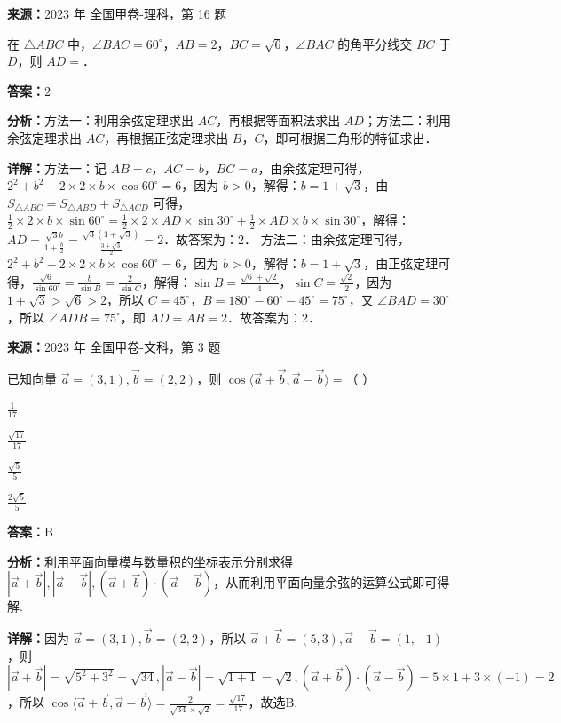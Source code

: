 \begin{question}[points=5]
\textbf{来源：}2023 年 全国甲卷-理科，第 16 题\par
在 $\triangle ABC$ 中，$\angle BAC = 60^\circ$，$AB = 2$，$BC = \sqrt{6}$，$\angle BAC$ 的角平分线交 $BC$ 于 $D$，则 $AD = $．
\fillin[{$2$}]
\begin{solution}
\textbf{答案：}$2$

\textbf{分析：}方法一：利用余弦定理求出 $AC$，再根据等面积法求出 $AD$；方法二：利用余弦定理求出 $AC$，再根据正弦定理求出 $B$，$C$，即可根据三角形的特征求出．

\textbf{详解：}方法一：记 $AB=c$，$AC=b$，$BC=a$，由余弦定理可得，$2^2+b^2-2\times2\times b\times\cos60^\circ = 6$，因为 $b>0$，解得：$b=1+\sqrt{3}$，由 $S_{\triangle ABC} = S_{\triangle ABD} + S_{\triangle ACD}$ 可得，$\frac{1}{2}\times2\times b\times\sin60^\circ = \frac{1}{2}\times2\times AD\times\sin30^\circ + \frac{1}{2}\times AD\times b\times\sin30^\circ$，解得：$AD = \frac{\sqrt{3}b}{1+\frac{b}{2}} = \frac{\sqrt{3}(1+\sqrt{3})}{\frac{3+\sqrt{3}}{2}} = 2$．故答案为：2．
方法二：由余弦定理可得，$2^2+b^2-2\times2\times b\times\cos60^\circ = 6$，因为 $b>0$，解得：$b=1+\sqrt{3}$，由正弦定理可得，$\frac{\sqrt{6}}{\sin60^\circ} = \frac{b}{\sin B} = \frac{2}{\sin C}$，解得：$\sin B = \frac{\sqrt{6}+\sqrt{2}}{4}$，$\sin C = \frac{\sqrt{2}}{2}$，因为 $1+\sqrt{3} > \sqrt{6} > 2$，所以 $C=45^\circ$，$B=180^\circ-60^\circ-45^\circ=75^\circ$，又 $\angle BAD = 30^\circ$，所以 $\angle ADB = 75^\circ$，即 $AD = AB = 2$．故答案为：2．
\end{solution}
\end{question}

\begin{question}[points=5]
\textbf{来源：}2023 年 全国甲卷-文科，第 3 题\par
已知向量 $\vec{a} = (3,1), \vec{b} = (2,2)$，则 $\cos\langle \vec{a}+\vec{b}, \vec{a}-\vec{b} \rangle =$（    ）
\begin{choices}
  \item $\frac{1}{17}$
  \item $\frac{\sqrt{17}}{17}$
  \item $\frac{\sqrt{5}}{5}$
  \item $\frac{2\sqrt{5}}{5}$
\end{choices}
\begin{solution}
\textbf{答案：}B

\textbf{分析：}利用平面向量模与数量积的坐标表示分别求得 $|\vec{a}+\vec{b}|, |\vec{a}-\vec{b}|, (\vec{a}+\vec{b})\cdot(\vec{a}-\vec{b})$，从而利用平面向量余弦的运算公式即可得解.

\textbf{详解：}因为 $\vec{a} = (3,1), \vec{b} = (2,2)$，所以 $\vec{a}+\vec{b} = (5,3), \vec{a}-\vec{b} = (1,-1)$，则 $|\vec{a}+\vec{b}| = \sqrt{5^2+3^2} = \sqrt{34}, |\vec{a}-\vec{b}| = \sqrt{1+1} = \sqrt{2}, (\vec{a}+\vec{b})\cdot(\vec{a}-\vec{b}) = 5\times1+3\times(-1)=2$，所以 $\cos\langle \vec{a}+\vec{b}, \vec{a}-\vec{b} \rangle = \frac{2}{\sqrt{34}\times\sqrt{2}} = \frac{\sqrt{17}}{17}$，故选B.
\end{solution}
\end{question}

